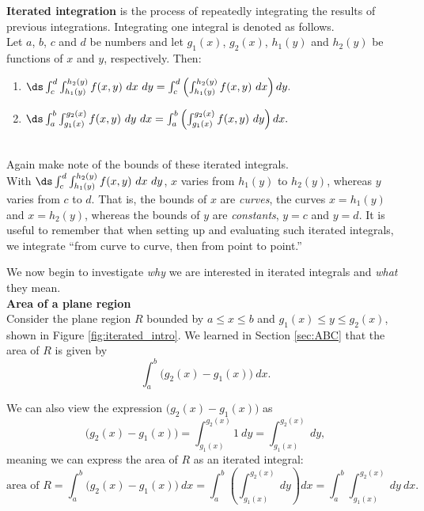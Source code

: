 {\textbf{Iterated integration} is the process of repeatedly integrating the results of previous integrations. Integrating one integral is denoted as follows.\\

Let $a$, $b$, $c$ and $d$ be numbers and let $g_1(x)$, $g_2(x)$, $h_1(y)$ and $h_2(y)$ be functions of $x$ and $y$, respectively. Then:
\begin{enumerate}
	\item $\ds \int_c^d\int_{h_1(y)}^{h_2(y)} f(x,y)\ dx\ dy = \int_c^d\left(\int_{h_1(y)}^{h_2(y)} f(x,y)\ dx\right) dy.$
	\item $\ds \int_a^b\int_{g_1(x)}^{g_2(x)} f(x,y)\ dy\ dx = \int_a^b\left(\int_{g_1(x)}^{g_2(x)} f(x,y)\ dy\right) dx.$
\end{enumerate}
}\\

Again make note of the bounds of these iterated integrals.\\
With $\ds \int_c^d\int_{h_1(y)}^{h_2(y)} f(x,y)\ dx\ dy$, $x$ varies from $h_1(y)$ to $h_2(y)$, whereas $y$ varies from $c$ to $d$. That is, the bounds of $x$ are \textit{curves}, the curves $x=h_1(y)$ and $x=h_2(y)$, whereas the bounds of $y$ are \textit{constants}, $y=c$ and $y=d$. It is useful to remember that when setting up and evaluating such iterated integrals, we integrate ``from curve to curve, then from point to point.''

We now begin to investigate \textit{why} we are interested in iterated integrals and \textit{what} they mean.\\

\noindent\textbf{\large Area of a plane region}\\

Consider the plane region $R$ bounded by $a\leq x\leq b$ and $g_1(x)\leq y\leq g_2(x)$, shown in Figure \ref{fig:iterated_intro}. We learned in Section \ref{sec:ABC} that the area of $R$ is given by 
$$\int_a^b \big(g_2(x)-g_1(x)\big)\ dx.$$

We can also view the expression $\big(g_2(x)-g_1(x)\big)$ as 
$$\big(g_2(x)-g_1(x)\big) = \int_{g_1(x)}^{g_2(x)} 1\ dy =\int_{g_1(x)}^{g_2(x)} \ dy,$$
meaning we can express the area of $R$ as an iterated integral:
$$\text{area of }R = \int_a^b \big(g_2(x)-g_1(x)\big)\ dx = \int_a^b\left(\int_{g_1(x)}^{g_2(x)} \ dy\right) dx =\int_a^b\int_{g_1(x)}^{g_2(x)} \ dy\ dx.$$


